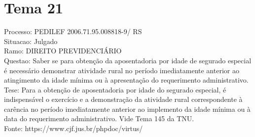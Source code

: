 \documentclass[12pt]{article}
\begin{document}
\section*{Tema 21}
Processo: PEDILEF 2006.71.95.008818-9/ RS\\
Situacao: Julgado\\
Ramo: DIREITO PREVIDENCIÁRIO\\
Questao: Saber se para obtenção da aposentadoria por idade de segurado especial é necessário demonstrar atividade rural no período imediatamente anterior ao atingimento da idade mínima ou à apresentação do requerimento administrativo.\\
Tese: Para a obtenção de aposentadoria por idade do segurado especial, é indispensável o exercício e a demonstração da atividade rural correspondente à carência no período imediatamente anterior ao implemento da idade mínima ou à data do requerimento administrativo. Vide Tema 145 da TNU.\\
Fonte: https://www.cjf.jus.br/phpdoc/virtus/
\end{document}
